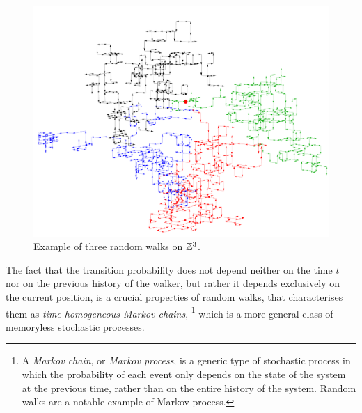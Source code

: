 \begin{figure}[tb]
    \centering
    \includegraphics[width=0.8\linewidth]{Figures/quantum-walks/3d-randomwalk.png}
    \caption{Example of three random walks on $\mathbb{Z}^3$.}
    \label{fig:intro:3DQWs}
\end{figure}
%  
The fact that the transition probability does not depend neither on the time $t$ nor on the previous history of the walker, but rather it depends exclusively on the current position, is a crucial properties of random walks, that characterises them as \textit{time-homogeneous Markov chains},
\footnote{A \textit{Markov chain}, or \textit{Markov process}, is a generic type of stochastic process in which the probability of each event only depends on the state of the system at the previous time, rather than on the entire history of the system. Random walks are a notable example of Markov process.}
which is a more general class of memoryless stochastic processes.

